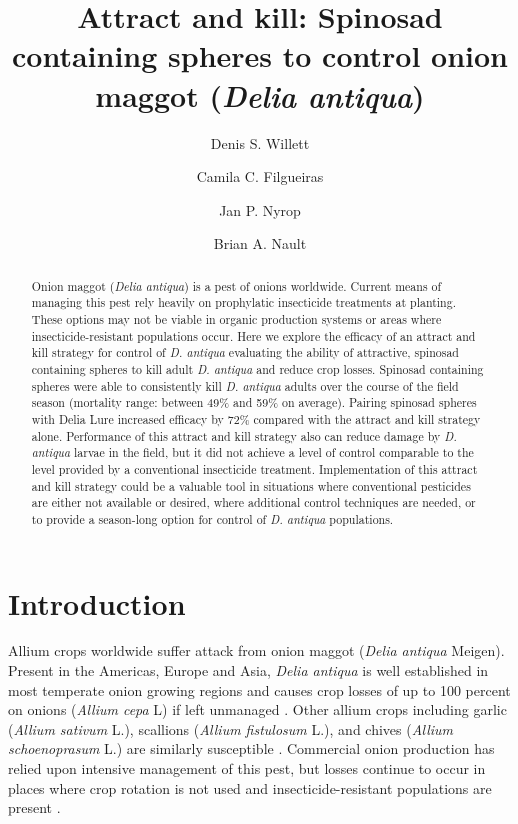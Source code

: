 \documentclass[alpha-refs]{wiley-article}
\title{Attract and kill: Spinosad containing spheres to control onion maggot (\textit{Delia antiqua})}
\author[1\authfn{1}]{Denis S. Willett}
\author[1\authfn{1}]{Camila C. Filgueiras}
\author[1]{Jan P. Nyrop}
\author[1]{Brian A. Nault}
\affil[1]{Department of Entomology, Cornell AgriTech, Cornell University, Geneva, NY, 14456, USA}
\begin{document}
\maketitle

\begin{abstract}

Onion maggot (\textit{Delia antiqua}) is a pest of onions worldwide. Current means of managing this pest rely heavily on prophylatic insecticide treatments at planting. These options may not be viable in organic production systems or areas where insecticide-resistant populations occur. Here we explore the efficacy of an attract and kill strategy for control of \textit{D. antiqua} evaluating the ability of attractive, spinosad containing spheres to kill adult \textit{D. antiqua} and reduce crop losses. Spinosad containing spheres were able to consistently kill \textit{D. antiqua} adults over the course of the field season (mortality range: between 49\% and 59\% on average). Pairing spinosad spheres with Delia Lure increased efficacy by 72\% compared with the attract and kill strategy alone. Performance of this attract and kill strategy also can reduce damage by \textit{D. antiqua}  larvae in the field, but it did not achieve a level of control comparable to the level provided by a conventional insecticide treatment. Implementation of this attract and kill strategy could be a valuable tool in situations where conventional pesticides are either not available or desired, where additional control techniques are needed, or to provide a season-long option for control of \textit{D. antiqua} populations.

\end{abstract}

\linenumbers
\section{Introduction}

Allium crops worldwide suffer attack from onion maggot (\textit{Delia antiqua} Meigen).  Present in the Americas, Europe and Asia, \textit{Delia antiqua} is well established in most temperate onion growing regions and causes crop losses of up to 100 percent on onions (\textit{Allium cepa} L) if left unmanaged \citep{nault2006performance, nault2006onion}.  Other allium crops including garlic (\textit{Allium sativum} L.), scallions (\textit{Allium fistulosum} L.), and chives (\textit{Allium schoenoprasum} L.) are similarly susceptible \citep{ellis1979factors,ning2017predicting,nault2007ecology}.  Commercial onion production has relied upon intensive management of this pest, but losses continue to occur in places where crop rotation is not used and insecticide-resistant populations are present \citep{martinson1988dispersal, nault2006onion}.  
\end{document}
